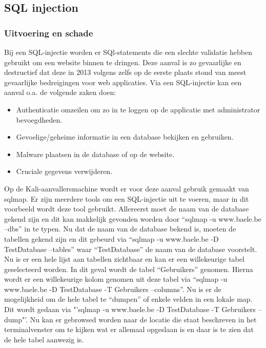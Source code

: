 \documentclass[pdftex,a4paper,12pt]{report}
\begin{document}
\subsection{SQL injection}
\subsubsection{Uitvoering en schade}
Bij een SQL-injectie worden er SQl-statements die een slechte validatie hebben gebruikt om een website binnen te dringen. Deze aanval is zo gevaarlijke en destructief dat deze in 2013 volgens \cite{Cisco2013} zelfs op de eerste plaats stond van meest gevaarlijke bedreigingen voor web applicaties. Via een SQL-injectie kan een aanval o.a. de volgende zaken doen:
\begin{itemize}
	\item Authenticatie omzeilen om zo in te loggen op de applicatie met administrator bevoegdheden.
	\item Gevoelige/geheime informatie in een database bekijken en gebruiken.
	\item Malware plaatsen in de database of op de website.
	\item Cruciale gegevens verwijderen.
\end{itemize}

Op de Kali-aanvallersmachine wordt er voor deze aanval gebruik gemaakt van sqlmap. Er zijn meerdere tools om een SQL-injectie uit te voeren, maar in dit voorbeeld wordt deze tool gebruikt. Allereerst moet de naam van de database gekend zijn en dit kan makkelijk gevonden worden door "`sqlmap -u www.baele.be --dbs"' in te typen. Nu dat de naam van de database bekend is, moeten de tabellen gekend zijn en dit gebeurd via "`sqlmap -u www.baele.be -D TestDatabase --tables"' waar "`TestDatabase"' de naam van de database voorstelt. Nu is er een hele lijst aan tabellen zichtbaar en kan er een willekeurige tabel geselecteerd worden. In dit geval wordt de tabel "`Gebruikers"' genomen. Hierna wordt er een willekeurige kolom genomen uit deze tabel via "`sqlmap -u www.baele.be -D TestDatabase -T Gebruikers --columns"'. Nu is er de mogelijkheid om de hele tabel te "`dumpen"' of enkele velden in een lokale map. Dit wordt gedaan via "'sqlmap -u www.baele.be -D TestDatabase -T Gebruikers --dump"'. Nu kan er gebrowsed worden naar de locatie die staat beschreven in het terminalvenster om te kijken wat er allemaal opgeslaan is en daar is te zien dat de hele tabel aanwezig is.
\end{document}
